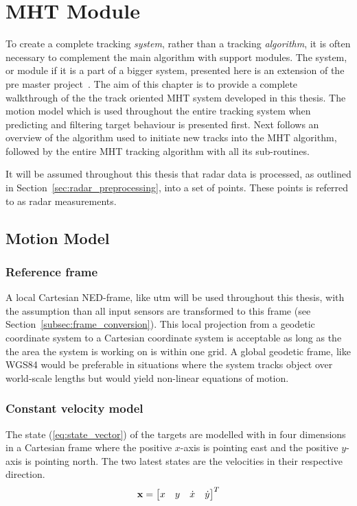 
\chapter{MHT Module}\label{chapter:mht-module}
To create a complete tracking \emph{system}, rather than a tracking \emph{\gls{algorithm}}, it is often necessary  to complement the main algorithm with support modules. The system, or module if it is a part of a bigger system, presented here is an extension of the pre master project~\cite{Liland_2017}. The aim of this chapter is to provide a complete walkthrough of the the track oriented MHT system developed in this thesis. The motion model which is used throughout the entire tracking system when predicting and filtering target behaviour is presented first. Next follows an overview of the algorithm used to initiate new tracks into the MHT algorithm, followed by the entire MHT tracking algorithm with all its sub-routines.

It will be assumed throughout this thesis that radar data is processed, as outlined in Section~\ref{sec:radar_preprocessing}, into a set of points. These points is referred to as radar measurements.

\section{Motion Model}\label{sec:motion-model}
\subsection{Reference frame}
A local Cartesian NED-frame, like \gls{utm} will be used throughout this thesis, with the assumption than all input sensors are transformed to this frame (see Section~\ref{subsec:frame_conversion}). This local projection from a geodetic coordinate system to a Cartesian coordinate system is acceptable as long as the the area the system is working on is within one grid. A global geodetic frame, like WGS84 would be preferable in situations where the system tracks object over world-scale lengths but would yield non-linear equations of motion.

\subsection{Constant velocity model}
The state (\ref{eq:state_vector}) of the targets are modelled with in four dimensions in a Cartesian frame where the positive \(x\)-axis is pointing east and the positive \(y\)-axis is pointing north. The two latest states are the velocities in their respective direction.
\begin{equation}
\boldsymbol{\mathbf{x}} = \begin{bmatrix}
x & y & \dot{x} & \dot{y}
\end{bmatrix}^T
\label{eq:state_vector}
\end{equation}

